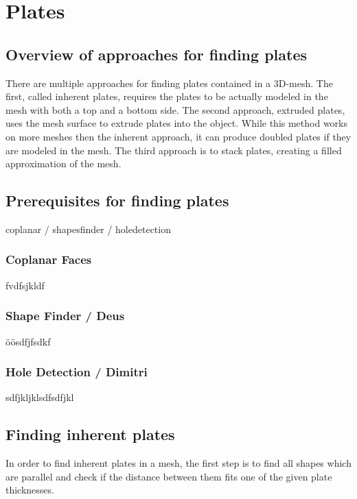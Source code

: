 \documentclass[../ClassicThesis.tex]{subfiles}
\begin{document}
\chapter{Plates}\label{ch:plates}

\section{Overview of approaches for finding plates}

There are multiple approaches for finding plates contained in a 3D-mesh. The first, called inherent plates, requires the plates to be actually modeled in the mesh with both a top and a bottom side. The second approach, extruded plates, uses the mesh surface to extrude plates into the object. While this method works on more meshes then the inherent approach, it can produce doubled plates if they are modeled in the mesh. The third approach is to stack plates, creating a filled approximation of the mesh.

\section{Prerequisites for finding plates}

coplanar / shapesfinder / holedetection

\subsection{Coplanar Faces}

fvdfsjkldf

\subsection{Shape Finder / Deus}

öösdfjfsdkf

\subsection{Hole Detection / Dimitri}

sdfjkljklsdfsdfjkl

\section{Finding inherent plates}

In order to find inherent plates in a mesh, the first step is to find all shapes which are parallel and check if the distance between them fits one of the given plate thicknesses.
\end{document}
